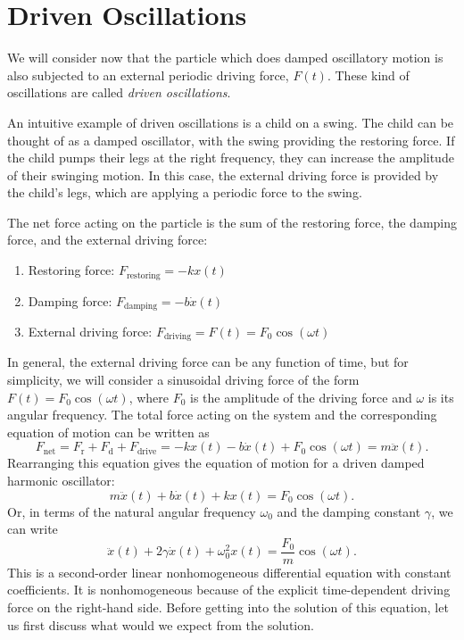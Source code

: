 \documentclass[12pt]{article}
\begin{document}
\section{Driven Oscillations}
We will consider now that the particle which does damped oscillatory motion is also subjected to an external periodic driving force, $F(t)$. These kind of oscillations are called \emph{driven oscillations}. 

An intuitive example of driven oscillations is a child on a swing. The child can be thought of as a damped oscillator, with the swing providing the restoring force. If the child pumps their legs at the right frequency, they can increase the amplitude of their swinging motion. In this case, the external driving force is provided by the child's legs, which are applying a periodic force to the swing.

The net force acting on the particle is the sum of the restoring force, the damping force, and the external driving force:
\begin{enumerate}
    \item Restoring force: $F_\text{restoring}=-kx(t)$
    \item Damping force: $F_\text{damping}=-b\dot{x}(t)$
    \item External driving force: $F_\text{driving}=F(t)=F_0\cos(\omega t)$
\end{enumerate}

In general, the external driving force can be any function of time, but for simplicity, we will consider a sinusoidal driving force of the form $F(t)=F_0\cos(\omega t)$, where $F_0$ is the amplitude of the driving force and $\omega$ is its angular frequency. The total force acting on the system and the corresponding equation of motion can be written as
\begin{equation}
    F_\text{net}=F_\text{r}+F_\text{d}+F_\text{drive}=-kx(t)-b\dot{x}(t)+F_0\cos(\omega t)=m\ddot{x}(t).
\end{equation}
Rearranging this equation gives the equation of motion for a driven damped harmonic oscillator:
\begin{equation}
    m\ddot{x}(t)+b\dot{x}(t)+kx(t)=F_0\cos(\omega t).
\end{equation}
Or, in terms of the natural angular frequency $\omega_0$ and the damping constant $\gamma$, we can write
\begin{equation}
    \ddot{x}(t)+2\gamma\dot{x}(t)+\omega_0^2 x(t)=\frac{F_0}{m}\cos(\omega t).
    \label{eq:driven-oscillator-eom}
\end{equation}
This is a second-order linear nonhomogeneous differential equation with constant coefficients. It is nonhomogeneous because of the explicit time-dependent driving force on the right-hand side. Before getting into the solution of this equation, let us first discuss what would we expect from the solution. 
\end{document}
